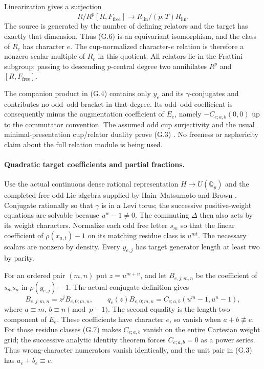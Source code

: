 Linearization gives a surjection
\[
 R/\overline{R^p[R,F_{\mathrm{free}}]}
       \longrightarrow R_{\mathrm{lin}}/(p,T)R_{\mathrm{lin}}.  \tag{G.6}
\]
The source is generated by the number of defining relators and the target has exactly that dimension. Thus (G.6) is an equivariant isomorphism, and the class of $R_e$ has character $e$. The cup-normalized character-$e$ relation is therefore a nonzero scalar multiple of $R_e$ in this quotient. All relators lie in the Frattini subgroup; passing to descending $p$-central degree two annihilates $R^p$ and $[R,F_{\mathrm{free}}]$.

The companion product in (G.4) contains only $y_e$ and its $\gamma$-conjugates and contributes no odd--odd bracket in that degree. Its odd--odd coefficient is consequently minus the augmentation coefficient of $E_e$, namely $-C_{e;a,b}(0,0)$ up to the commutator convention. The assumed odd cup surjectivity and the usual minimal-presentation cup/relator duality prove (G.3) \cite[\S8, pp.~21--23]{McCallumSharifi2003}. No freeness or asphericity claim about the full relation module is being used.

\paragraph{Quadratic target coefficients and partial fractions.}
Use the actual continuous dense rational representation $H\to U(\mathbb Q_p)$ and the completed free odd Lie algebra supplied by Hain--Matsumoto and Brown \cite{HainMatsumoto2001,Brown2019}. Conjugate rationally so that $\gamma$ is in a Levi torus; the successive positive-weight equations are solvable because $u^w-1\ne0$. The commuting $\Delta$ then also acts by its weight characters. Normalize each odd free letter $s_m$ so that the linear coefficient of $\rho(x_{a,t})-1$ on its matching residue class is $u^{mt}$. The necessary scalars are nonzero by density. Every $y_{e,j}$ has target generator length at least two by parity.

For an ordered pair $(m,n)$ put $z=u^{m+n}$, and let $B_{e,j;m,n}$ be the coefficient of $s_ms_n$ in $\rho(y_{e,j})-1$. The actual conjugate definition gives
\[
 B_{e,j;m,n}=z^jB_{e,0;m,n},
 \qquad
 q_e(z)B_{e,0;m,n}=C_{e;a,b}(u^m-1,u^n-1),                    \tag{G.7}
\]
where $a\equiv m$, $b\equiv n\pmod{p-1}$. The second equality is the length-two component of $E_e$. These coefficients have character $e$, so vanish when $a+b\not\equiv e$. For those residue classes (G.7) makes $C_{e;a,b}$ vanish on the entire Cartesian weight grid; the successive analytic identity theorem forces $C_{e;a,b}=0$ as a power series. Thus wrong-character numerators vanish identically, and the unit pair in (G.3) has $a_e+b_e\equiv e$.

